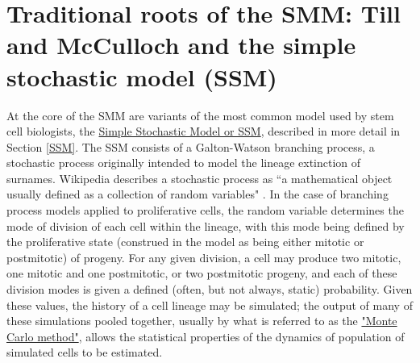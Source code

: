 \section{Traditional roots of the SMM: Till and McCulloch and the simple stochastic model (SSM)}
\label{TMS}
At the core of the SMM are variants of the most common model used by stem cell biologists, the \hyperref[SSM]{Simple Stochastic Model or SSM}, described in more detail in Section \ref{SSM}. The SSM consists of a Galton-Watson branching process, a stochastic process originally intended to model the lineage extinction of surnames. Wikipedia describes a stochastic process as ``a mathematical object usually defined as a collection of random variables" \cite{Wikipedia2018}. In the case of branching process models applied to proliferative cells, the random variable determines the mode of division of each cell within the lineage, with this mode being defined by the proliferative state (construed in the model as being either mitotic or postmitotic) of progeny. For any given division, a cell may produce two mitotic, one mitotic and one postmitotic, or two postmitotic progeny, and each of these division modes is given a defined (often, but not always, static) probability. Given these values, the history of a cell lineage may be simulated; the output of many of these simulations pooled together, usually by what is referred to as the \hyperref[MonteCarlo]{"Monte Carlo method"}, allows the statistical properties of the dynamics of population of simulated cells to be estimated.


